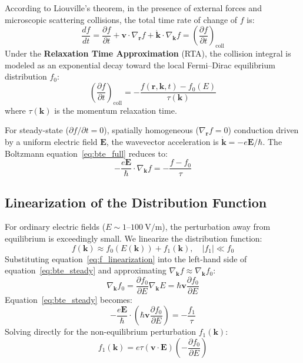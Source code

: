 \documentclass[11pt,a4paper]{article}
\newcommand{\vb}[1]{\mathbf{#1}}
\begin{document}
According to Liouville's theorem, in the presence of external forces and microscopic scattering collisions, the total time rate of change of $f$ is:
\begin{equation}
\frac{df}{dt} = \frac{\partial f}{\partial t} + \vb{v}\cdot\nabla_{\vb{r}}f + \dot{\vb{k}}\cdot\nabla_{\vb{k}}f = \left(\frac{\partial f}{\partial t}\right)_{\mathrm{coll}}
\label{eq:bte_full}
\end{equation}
Under the \textbf{Relaxation Time Approximation} (RTA), the collision integral is modeled as an exponential decay toward the local Fermi--Dirac equilibrium distribution $f_0$:
\begin{equation}
\left(\frac{\partial f}{\partial t}\right)_{\mathrm{coll}} = -\frac{f(\vb{r}, \vb{k}, t) - f_0(E)}{\tau(\vb{k})}
\label{eq:bte_rta}
\end{equation}
where $\tau(\vb{k})$ is the momentum relaxation time. 

For steady-state ($\partial f/\partial t = 0$), spatially homogeneous ($\nabla_{\vb{r}}f = 0$) conduction driven by a uniform electric field $\vb{E}$, the wavevector acceleration is $\dot{\vb{k}} = -e\vb{E}/\hbar$. The Boltzmann equation~\eqref{eq:bte_full} reduces to:
\begin{equation}
-\frac{e\vb{E}}{\hbar}\cdot\nabla_{\vb{k}}f = -\frac{f - f_0}{\tau}
\label{eq:bte_steady}
\end{equation}

\subsection{Linearization of the Distribution Function}
For ordinary electric fields ($E \sim 1\text{--}100\ \mathrm{V/m}$), the perturbation away from equilibrium is exceedingly small. We linearize the distribution function:
\begin{equation}
f(\vb{k}) \approx f_0(E(\vb{k})) + f_1(\vb{k}), \quad |f_1| \ll f_0
\label{eq:f_linearization}
\end{equation}
Substituting equation~\eqref{eq:f_linearization} into the left-hand side of equation~\eqref{eq:bte_steady} and approximating $\nabla_{\vb{k}}f \approx \nabla_{\vb{k}}f_0$:
\begin{equation}
\nabla_{\vb{k}}f_0 = \frac{\partial f_0}{\partial E}\nabla_{\vb{k}}E = \hbar\vb{v}\frac{\partial f_0}{\partial E}
\end{equation}
Equation~\eqref{eq:bte_steady} becomes:
\begin{equation}
-\frac{e\vb{E}}{\hbar}\cdot\left(\hbar\vb{v}\frac{\partial f_0}{\partial E}\right) = -\frac{f_1}{\tau}
\end{equation}
Solving directly for the non-equilibrium perturbation $f_1(\vb{k})$:
\begin{equation}
\boxed{f_1(\vb{k}) = e\tau(\vb{v}\cdot\vb{E})\left(-\frac{\partial f_0}{\partial E}\right)}
\label{eq:f1_solution}
\end{equation}
\end{document}
